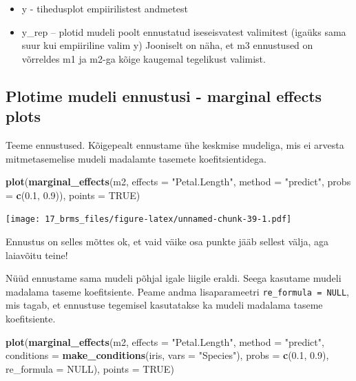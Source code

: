 \documentclass[]{book}
\newenvironment{Shaded}{\begin{snugshade}}{\end{snugshade}}
\newcommand{\KeywordTok}[1]{\textcolor[rgb]{0.13,0.29,0.53}{\textbf{#1}}}
\newcommand{\DataTypeTok}[1]{\textcolor[rgb]{0.13,0.29,0.53}{#1}}
\newcommand{\FloatTok}[1]{\textcolor[rgb]{0.00,0.00,0.81}{#1}}
\newcommand{\StringTok}[1]{\textcolor[rgb]{0.31,0.60,0.02}{#1}}
\newcommand{\OtherTok}[1]{\textcolor[rgb]{0.56,0.35,0.01}{#1}}
\newcommand{\NormalTok}[1]{#1}
\providecommand{\tightlist}{%
  \setlength{\itemsep}{0pt}\setlength{\parskip}{0pt}}
\begin{document}
\begin{itemize}
\tightlist
\item
  y - tihedusplot empiirilistest andmetest
\item
  y\_rep -- plotid mudeli poolt ennustatud iseseisvatest valimitest
  (igaüks sama suur kui empiiriline valim y) Jooniselt on näha, et m3
  ennustused on võrreldes m1 ja m2-ga kõige kaugemal tegelikust
  valimist.
\end{itemize}

\subsection{Plotime mudeli ennustusi - marginal effects
plots}\label{plotime-mudeli-ennustusi---marginal-effects-plots}

Teeme ennustused. Kõigepealt ennustame ühe keskmise mudeliga, mis ei
arvesta mitmetasemelise mudeli madalamte tasemete koefitsientidega.

\begin{Shaded}
\begin{Highlighting}[]
\KeywordTok{plot}\NormalTok{(}\KeywordTok{marginal_effects}\NormalTok{(m2, }\DataTypeTok{effects =} \StringTok{"Petal.Length"}\NormalTok{, }\DataTypeTok{method =} \StringTok{"predict"}\NormalTok{, }\DataTypeTok{probs =} \KeywordTok{c}\NormalTok{(}\FloatTok{0.1}\NormalTok{, }\FloatTok{0.9}\NormalTok{)), }\DataTypeTok{points =} \OtherTok{TRUE}\NormalTok{)}
\end{Highlighting}
\end{Shaded}

\texttt{[image: 17\_brms\_files/figure-latex/unnamed-chunk-39-1.pdf]}

Ennustus on selles mõttes ok, et vaid väike osa punkte jääb sellest
välja, aga laiavõitu teine!

Nüüd ennustame sama mudeli põhjal igale liigile eraldi. Seega kasutame
mudeli madalama taseme koefitsiente. Peame andma lisaparameetri
\texttt{re\_formula\ =\ NULL}, mis tagab, et ennustuse tegemisel
kasutatakse ka mudeli madalama taseme koefitsiente.

\begin{Shaded}
\begin{Highlighting}[]
\KeywordTok{plot}\NormalTok{(}\KeywordTok{marginal_effects}\NormalTok{(m2, }\DataTypeTok{effects =} \StringTok{"Petal.Length"}\NormalTok{, }\DataTypeTok{method =} \StringTok{"predict"}\NormalTok{, }\DataTypeTok{conditions =} \KeywordTok{make_conditions}\NormalTok{(iris, }\DataTypeTok{vars =} \StringTok{"Species"}\NormalTok{), }\DataTypeTok{probs =} \KeywordTok{c}\NormalTok{(}\FloatTok{0.1}\NormalTok{, }\FloatTok{0.9}\NormalTok{), }\DataTypeTok{re_formula =} \OtherTok{NULL}\NormalTok{), }\DataTypeTok{points =} \OtherTok{TRUE}\NormalTok{)}
\end{Highlighting}
\end{Shaded}
\end{document}
